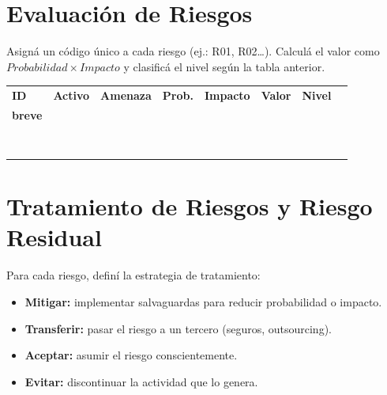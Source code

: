 \documentclass[11pt,a4paper]{article}
\begin{document}
\section{Evaluación de Riesgos}\label{sec:evaluacion}

Asigná un código único a cada riesgo (ej.: R01, R02\ldots). Calculá el valor como \(Probabilidad \times Impacto\) y clasificá el nivel según la tabla anterior.

\begin{center}
\scriptsize
\renewcommand{\arraystretch}{1.6}
\begin{tabularx}{\textwidth}{@{} >{\centering\arraybackslash}p{0.8cm} >{\centering\arraybackslash}p{1.2cm} >{\centering\arraybackslash}p{1.6cm} >{\centering\arraybackslash}p{1.1cm} >{\centering\arraybackslash}p{1.3cm} >{\centering\arraybackslash}p{1.1cm} >{\centering\arraybackslash}p{1.4cm} X @{}}
\toprule
\textbf{ID} & \textbf{Activo} & \textbf{Amenaza} & \textbf{Prob.} & \textbf{Impacto} & \textbf{Valor} & \textbf{Nivel} & \shortstack{\textbf{Justificación}\\\textbf{breve}} \\
\midrule
 & & & & & & & \\
 & & & & & & & \\
 & & & & & & & \\
 & & & & & & & \\
 & & & & & & & \\
 & & & & & & & \\
 & & & & & & & \\
 & & & & & & & \\
\bottomrule
\end{tabularx}
\end{center}

\section{Tratamiento de Riesgos y Riesgo Residual}\label{sec:tratamiento}

Para cada riesgo, definí la estrategia de tratamiento:
\begin{itemize}[leftmargin=*]
  \item \textbf{Mitigar:} implementar salvaguardas para reducir probabilidad o impacto.
  \item \textbf{Transferir:} pasar el riesgo a un tercero (seguros, outsourcing).
  \item \textbf{Aceptar:} asumir el riesgo conscientemente.
  \item \textbf{Evitar:} discontinuar la actividad que lo genera.
\end{itemize}
\end{document}
